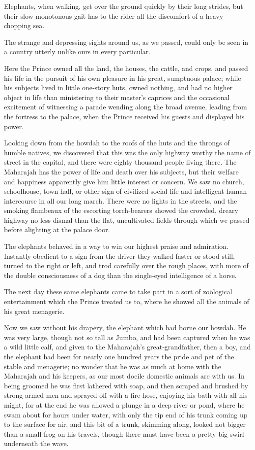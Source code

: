 \documentclass[12pt]{book}
\begin{document}
Elephants, when walking, get over the ground quickly by their long strides,
but their slow monotonous gait has to the rider all the discomfort of a heavy
chopping sea.

The strange and depressing sights around us, as we passed, could only be seen
in a country utterly unlike ours in every particular.

Here the Prince owned all the land, the houses, the cattle, and crops, and passed
his life in the pursuit of his own pleasure in his great, sumptuous palace; while his
subjects lived in little one‐story huts, owned nothing, and had no higher object in
life than ministering to their master’s caprices and the occasional excitement of
witnessing a parade wending along the broad avenue, leading from the fortress
to the palace, when the Prince received his guests and displayed his power.

Looking down from the howdah to the roofs of the huts and the throngs of
humble natives, we discovered that this was the only highway worthy the name
of street in the capital, and there were eighty thousand people living there. The
Maharajah has the power of life and death over his subjects, but their welfare
and happiness apparently give him little interest or concern. We saw no church,
schoolhouse, town hall, or other sign of civilized social life and intelligent human
intercourse in all our long march. There were no lights in the streets, and the
smoking flambeaux of the escorting torch‐bearers showed the crowded, dreary
highway no less dismal than the flat, uncultivated fields through which we passed
before alighting at the palace door.

The elephants behaved in a way to win our highest praise and admiration.
Instantly obedient to a sign from the driver they walked faster or stood still,
turned to the right or left, and trod carefully over the rough places, with more of
the double consciousness of a dog than the single‐eyed intelligence of a horse.

The next day these same elephants came to take part in a sort of zoölogical
entertainment which the Prince treated us to, where he showed all the animals of
his great menagerie.

Now we saw without his drapery, the elephant which had borne our howdah.
He was very large, though not so tall as Jumbo, and had been captured when
he was a wild little calf, and given to the Maharajah’s great‐grandfather, then a
boy, and the elephant had been for nearly one hundred years the pride and pet
of the stable and menagerie; no wonder that he was as much at home with the
Maharajah and his keepers, as our most docile domestic animals are with us. In
being groomed he was first lathered with soap, and then scraped and brushed by
strong‐armed men and sprayed off with a fire‐hose, enjoying his bath with all his
might, for at the end he was allowed a plunge in a deep river or pond, where he
swam about for hours under water, with only the tip end of his trunk coming up
to the surface for air, and this bit of a trunk, skimming along, looked not bigger
than a small frog on his travels, though there must have been a pretty big swirl
underneath the wave.
\end{document}
